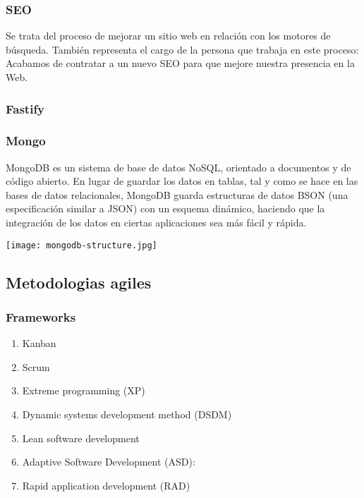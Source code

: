     \subsubsection{SEO}
    
        Se trata del proceso de mejorar un sitio web en relación con los motores de búsqueda. También representa el cargo de la persona que trabaja en este proceso: Acabamos de contratar a un nuevo SEO para que mejore nuestra presencia en la Web.

    \subsubsection{Fastify}

    \subsubsection{Mongo}

        MongoDB es un sistema de base de datos NoSQL, orientado a documentos y de código abierto. En lugar de guardar los datos en tablas, tal y como se hace en las bases de datos relacionales, MongoDB guarda estructuras de datos BSON (una especificación similar a JSON) con un esquema dinámico, haciendo que la integración de los datos en ciertas aplicaciones sea más fácil y rápida.

        \texttt{[image: mongodb-structure.jpg]}


\subsection{Metodologias agiles}


    \subsubsection{Frameworks}

    \begin{enumerate}
        \item Kanban
        \item Scrum
        \item Extreme programming (XP)
        \item Dynamic systems development method (DSDM)
        \item Lean software development
        \item Adaptive Software Development (ASD):
        \item Rapid application development (RAD)
    \end{enumerate}

